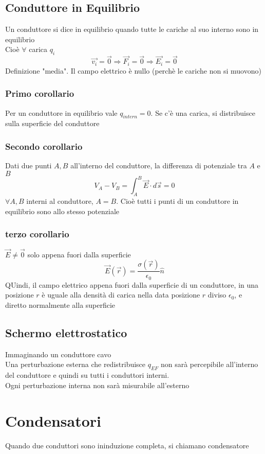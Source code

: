 \documentclass[a4paper]{report}
\begin{document}
  \subsection{Conduttore in Equilibrio}
  Un conduttore si dice in equilibrio quando tutte le cariche al suo interno sono in equilibrio\\
  Cioè $\forall$ carica $q_i$
  \[\vec{v_i} = \vec{0} \Rightarrow \vec{F_i} = \vec{0} \Rightarrow \vec{E_i} = \vec{0}\]
  Definizione "media". Il campo elettrico è nullo (perchè le cariche non si muovono)

  \subsubsection{Primo corollario}
  Per un conduttore in equilibrio vale $q_{intern} =0$. Se c'è una carica, si distribuisce sulla superficie del conduttore
  \subsubsection{Secondo corollario}
  Dati due punti $A, B$ all'interno del conduttore, la differenza di potenziale tra $A$ e $B$
  \[V_A - V_B = \int_A^B \vec{E}\cdot d\vec{s}=0 \]
  $\forall A,B$ interni al conduttore, $A=B$. Cioè tutti i punti di un conduttore in equilibrio sono allo stesso potenziale
  \subsubsection{terzo corollario}
  \( \vec{E} \neq \vec{0} \) solo appena fuori dalla superficie
  \[ \vec{E}(\vec{r}) = \frac{\sigma(\vec{r})}{\epsilon_0} \hat{n} \]
  QUindi, il campo elettrico appena fuori dalla superficie di un conduttore, in una posizione $r$ è uguale alla densità di carica nella data posizione $r$ diviso $\epsilon_0$, e diretto normalmente alla superficie

  \subsection{Schermo elettrostatico}
  Immaginando un conduttore cavo\\
  Una perturbazione esterna che redistribuisce $q_{EF}$ non sarà percepibile all'interno del conduttore e quindi su tutti i conduttori interni.\\
  Ogni perturbazione interna non sarà misurabile all'esterno

  \section{Condensatori}
  Quando due conduttori sono ininduzione completa, si chiamano condensatore
\end{document}
